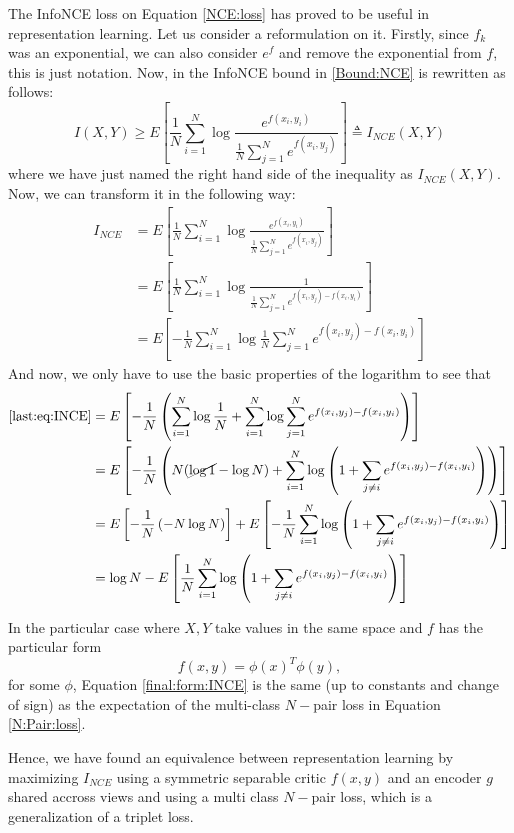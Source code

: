 The InfoNCE loss on Equation \eqref{NCE:loss} has proved to be useful in representation learning. Let us consider a reformulation on it. Firstly, since $f_k$ was an exponential, we can also consider $e^f$ and remove the exponential from $f$, this is just notation. Now, in \cite{poole_variational_2019} the InfoNCE bound in \eqref{Bound:NCE} is rewritten as follows:
\[
I(X,Y) \geq E\left[ \frac{1}{N} \sum_{i = 1}^N \log \frac{e^{f(x_i,y_i)}}{\frac{1}{N}\sum_{j=1}^N e^{f(x_i,y_j)}}\right] \triangleq  I_{NCE}(X,Y)
\]
where we have just named the right hand side of the inequality as $I_{NCE}(X,Y)$. Now, we can transform it in the following way:
\begin{align}
I_{NCE}  & = E\left[ \frac{1}{N} \sum_{i = 1}^N \log \frac{e^{f(x_i,y_i)}}{\frac{1}{N}\sum_{j=1}^N e^{f(x_i,y_j)}}\right]\nonumber \\
& = E\left[ \frac{1}{N} \sum_{i = 1}^N \log \frac{1}{\frac{1}{N}\sum_{j=1}^N e^{f(x_i,y_j) - f(x_i,y_i)}}\right]\nonumber \\
& = E\left[ -  \frac{1}{N} \sum_{i = 1}^N \log \frac{1}{N} \sum_{j=1}^N e^{f(x_i,y_j) - f(x_i,y_i)}\right] \label{last:eq:INCE}
\end{align}
And now, we only have to use the basic properties of the logarithm to see that
\begin{align}
\text{\eqref{last:eq:INCE}} & = E\left[-\frac{1}{N}\left(\sum_{i=1}^N \log \frac{1}{N} + \sum_{i=1}^N \log \sum_{j = 1}^N e^{f(x_i,y_j) - f(x_i,y_i)} \right)\right] \nonumber \\
& = E\left[-\frac{1}{N}\left( N(\cancel{\log 1} - \log N ) + \sum_{i=1}^N \log \left( 1  + \sum_{j \neq i} e^{f(x_i,y_j) - f(x_i,y_i)} \right)\right)\right] \nonumber\\ 
& = E\left[-\frac{1}{N}\left(-N\log N\right)\right] + E\left[-\frac{1}{N}\sum_{i=1}^N \log \left( 1  + \sum_{j \neq i} e^{f(x_i,y_j) - f(x_i,y_i)} \right)\right] \nonumber \\
& = \log N - E\left[ \frac{1}{N} \sum_{i=1}^N \log \left( 1+ \sum_{j\neq i}e^{f(x_i,y_j)- f(x_i,y_i)}\right)\right] \label{final:form:INCE}
\end{align}

In the particular case where $X,Y$ take values in the same space and $f$ has the particular form 
\[
f(x,y) = \phi(x)^T \phi(y),  
\]
for some $\phi$, Equation \eqref{final:form:INCE} is the same (up to constants and change of sign) as the expectation of the multi-class $N-$pair loss in Equation \eqref{N:Pair:loss}.

Hence, we have found an equivalence between representation learning by maximizing $I_{NCE}$ using a symmetric separable critic $f(x,y)$ and an encoder $g$ shared accross views and using a multi class $N-$pair loss, which is a generalization of a triplet loss.


